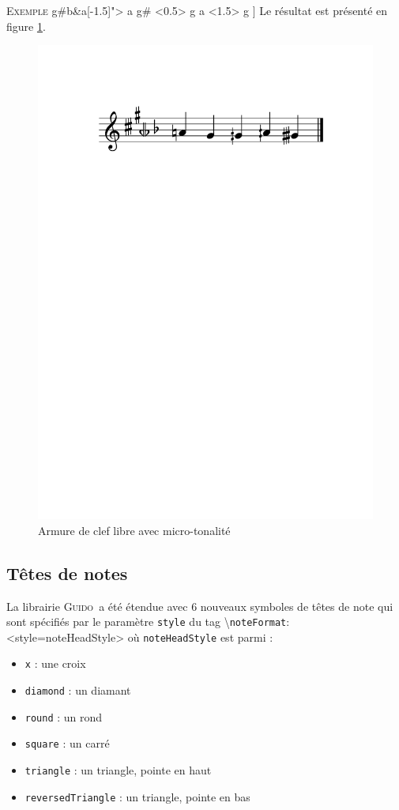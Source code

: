 \documentclass{article}
\newenvironment{gmncode}	{\vspace{-2mm}\small\verbatim}{\endverbatim\vspace{-2mm}}
\newcommand{\guido}			{\textsc{Guido}}
\newcommand{\code}[1]		{{\small \texttt{#1}}}
\newcommand{\guidotag}[1]	{\textbackslash\code{#1}}
\newcommand{\exemple}		{\vspace{2mm}\hspace*{-6mm}\textsc{Exemple}}
\begin{document}
\exemple
\begin{gmncode}
[
  \key<"free=c[1.5]g#b&a[-1.5]"> a g# 
  \alter<0.5> g  a \alter<1.5> g 
]
\end{gmncode}
Le résultat est présenté en figure \ref{fig:freekey}.
\begin{figure}[h]
\centering
\includegraphics[width=0.75\columnwidth]{img/partitions/freekey.pdf}
\caption{Armure de clef libre avec micro-tonalité}
\label{fig:freekey}
\end{figure}


\subsection{Têtes de notes}\label{subsec:tetes_notes}
%
La librairie \guido\ a été étendue avec 6 nouveaux symboles de têtes de note qui sont spécifiés par le paramètre \code{style} du tag \guidotag{noteFormat}:
\begin{gmncode}
  \noteFormat<style=noteHeadStyle>
\end{gmncode}
où \code{noteHeadStyle} est parmi :
\begin{itemize}
    \item \code{x} : une croix
    \item \code{diamond} : un diamant
    \item \code{round} : un rond
    \item \code{square} : un carré
    \item \code{triangle} : un triangle, pointe en haut
    \item \code{reversedTriangle} : un triangle, pointe en bas
\end{itemize} 
\end{document}
